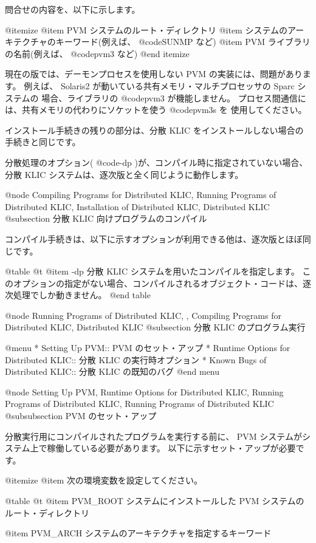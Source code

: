 {{{{問合せの内容を、以下に示します。

@itemize
@item
 PVM システムのルート・ディレクトリ
@item
システムのアーキテクチャのキーワード(例えば、 @code{SUNMP} など)
@item
PVM ライブラリの名前(例えば、 @code{pvm3} など)
@end itemize

現在の版では、デーモンプロセスを使用しない PVM の実装には、問題があります。
例えば、 Solaris2 が動いている共有メモリ・マルチプロセッサの Sparc システムの
場合、ライブラリの @code{pvm3} が機能しません。
プロセス間通信には、共有メモリの代わりにソケットを使う @code{pvm3s} を
使用してください。

インストール手続きの残りの部分は、分散 KLIC をインストールしない場合の手続きと同じです。

分散処理のオプション( @code{-dp} )が、コンパイル時に指定されていない場合、
分散 KLIC システムは、逐次版と全く同じように動作します。

@node Compiling Programs for Distributed KLIC, Running Programs of Distributed KLIC, Installation of Distributed KLIC, Distributed KLIC
@subsection 分散 KLIC 向けプログラムのコンパイル

コンパイル手続きは、以下に示すオプションが利用できる他は、逐次版とほぼ同じです。

@table @t
@item -dp
分散 KLIC システムを用いたコンパイルを指定します。
このオプションの指定がない場合、コンパイルされるオブジェクト・コードは、逐次処理でしか動きません。
@end table

@node Running Programs of Distributed KLIC,  , Compiling Programs for Distributed KLIC, Distributed KLIC
@subsection 分散 KLIC のプログラム実行

@menu
* Setting Up PVM::                          PVM のセット・アップ
* Runtime Options for Distributed KLIC::    分散 KLIC の実行時オプション
* Known Bugs of Distributed KLIC::          分散 KLIC の既知のバグ
@end menu

@node Setting Up PVM, Runtime Options for Distributed KLIC, Running Programs of Distributed KLIC, Running Programs of Distributed KLIC
@subsubsection PVM のセット・アップ

分散実行用にコンパイルされたプログラムを実行する前に、 PVM システムがシステム上で稼働している必要があります。
以下に示すセット・アップが必要です。

@itemize
@item
次の環境変数を設定してください。

@table @t
@item PVM_ROOT
システムにインストールした PVM システムのルート・ディレクトリ

@item PVM_ARCH
システムのアーキテクチャを指定するキーワード

}}}}
